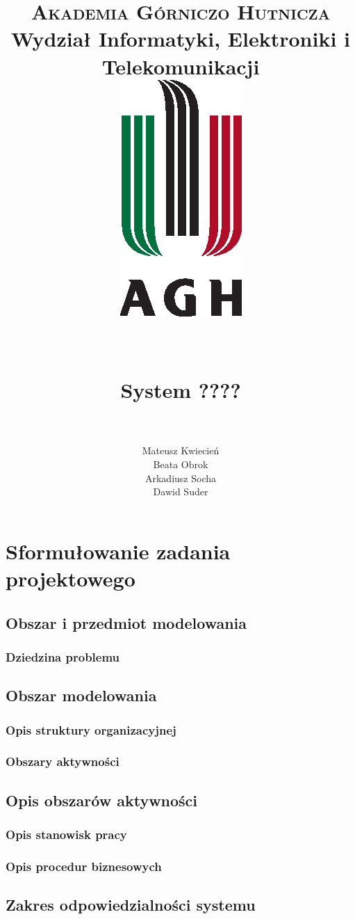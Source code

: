 \documentclass[paper=a4, fontsize=11pt]{scrartcl}
\title{
		\usefont{OT1}{bch}{b}{n}
		\normalfont \normalsize \textsc{Akademia Górniczo Hutnicza} \\ [25pt]
		Wydział Informatyki, Elektroniki i Telekomunikacji
		\horrule{0.5pt} \\[0.4cm]
		\includegraphics[width=.35\textwidth]{img/agh_znk_wbr_cmyk.eps} \\ \ \\ \ \\
		\huge System ???? \\
		\horrule{2pt} \\[0.5cm]
}
\author{
		\normalfont \normalsize
        Mateusz Kwiecień\\[-3pt]	\normalsize
        Beata Obrok\\[-3pt]			\normalsize
        Arkadiusz Socha\\[-3pt]		\normalsize
        Dawid Suder\\[-3pt]			\normalsize
}
\date{}
\numberwithin{equation}{section}		%
\numberwithin{figure}{section}			%
\numberwithin{table}{section}				%
\begin{document}
\maketitle
\tableofcontents

\section{Sformułowanie zadania projektowego}

	\subsection{Obszar i przedmiot modelowania}

		\subsubsection{Dziedzina problemu}

	\subsection{Obszar modelowania}

		\subsubsection{Opis struktury organizacyjnej}

		\subsubsection{Obszary aktywności}

	\subsection{Opis obszarów aktywności}

		\subsubsection{Opis stanowisk pracy}

		\subsubsection{Opis procedur biznesowych}

	\subsection{Zakres odpowiedzialności systemu}
\end{document}
